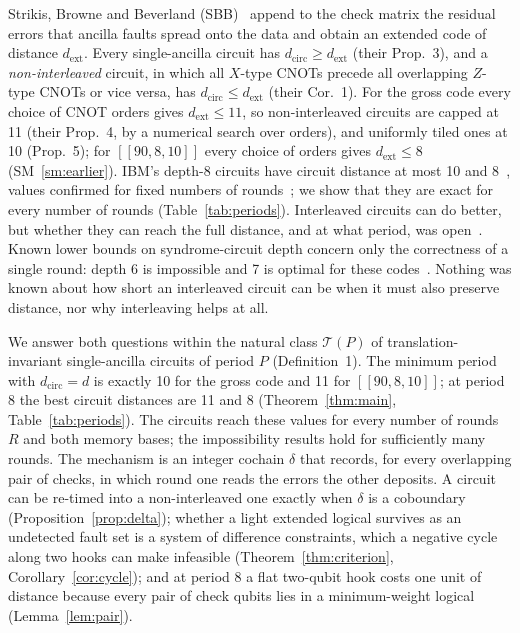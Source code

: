 \documentclass[aps,prl,twocolumn,superscriptaddress,nofootinbib]{revtex4-2}
\newif\ifshowclaimtags \showclaimtagsfalse
\newcommand{\cl}[1]{\ifshowclaimtags\textsuperscript{\textcolor{blue}{\scriptsize[#1]}}\fi}
\newcommand{\dcirc}{d_{\mathrm{circ}}}
\newcommand{\dext}{d_{\mathrm{ext}}}
\newcommand{\code}[1]{[[#1]]}
\newcommand{\T}{\mathcal{T}}
\begin{document}
Strikis, Browne and Beverland (SBB)~\cite{Strikis2026} append to the check matrix the
residual errors that ancilla faults spread onto the data and obtain an extended code of
distance $\dext$. Every single-ancilla circuit has $\dcirc\ge\dext$ (their Prop.~3), and
a \emph{non-interleaved} circuit, in which all $X$-type CNOTs precede all overlapping
$Z$-type CNOTs or vice versa, has $\dcirc\le\dext$ (their Cor.~1). For the gross code
every choice of CNOT orders gives $\dext\le11$, so non-interleaved circuits are capped at
11 (their Prop.~4, by a numerical search over orders), and uniformly tiled ones at 10
(Prop.~5); for $\code{90,8,10}$ every choice of orders gives $\dext\le8$
(SM~\ref{sm:earlier})\cl{L-22}. IBM's depth-8 circuits have circuit distance at most 10 and
8~\cite{Bravyi2024}, values confirmed for fixed numbers of
rounds~\cite{Tesseract2025,Crocker2026}; we show that they are exact for every number of
rounds (Table~\ref{tab:periods}). Interleaved circuits can do better, but whether
they can reach the full distance, and at what period, was open~\cite{Strikis2026}.
Known lower bounds on syndrome-circuit depth concern only the correctness of a single
round: depth 6 is impossible and 7 is optimal for these
codes~\cite{Li2025parity,Zhang2026ASC,DurazoRocha2026}.
Nothing was known about how short an interleaved circuit can be when it must also
preserve distance, nor why interleaving helps at all.

We answer both questions within the natural class $\T(P)$ of translation-invariant
single-ancilla circuits of period $P$ (Definition~1). The minimum period with $\dcirc=d$
is exactly 10 for the gross code and 11 for $\code{90,8,10}$; at period 8 the best
circuit distances are 11 and 8 (Theorem~\ref{thm:main}, Table~\ref{tab:periods})\cl{L-2,L-3,L-5}.
The circuits reach these values for every number of rounds $R$ and both memory bases; the
impossibility results hold for sufficiently many rounds. The mechanism is an integer
cochain $\delta$ that records, for every overlapping pair of checks, in which round one
reads the errors the other deposits. A circuit can be re-timed into a non-interleaved one
exactly when $\delta$ is a coboundary (Proposition~\ref{prop:delta}); whether a light
extended logical survives as an undetected fault set is a system of difference
constraints, which a negative cycle along two hooks can make infeasible
(Theorem~\ref{thm:criterion}, Corollary~\ref{cor:cycle}); and at period 8 a flat
two-qubit hook costs one unit of distance because every pair of check qubits lies in a
minimum-weight logical (Lemma~\ref{lem:pair}).
\end{document}
